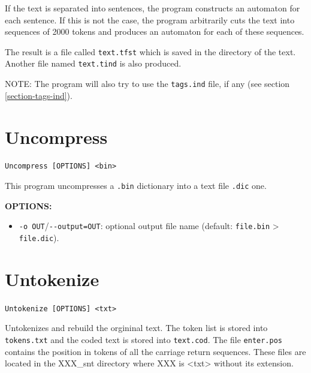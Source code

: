 \bigskip
\noindent If the text is separated into sentences, the program constructs an
automaton for each sentence. If this is not the case, the program arbitrarily
cuts the text into sequences of 2000 tokens and produces an automaton for
each of these sequences.

\bigskip
\noindent The result is a file called \verb+text.tfst+ which is saved in the directory of
the text. Another file named \verb+text.tind+ is also produced.

\bigskip
\noindent NOTE: The program will also try to use the \verb+tags.ind+ file, if
any (see section \ref{section-tags-ind}).







\section{Uncompress}
\label{section-Uncompress}
\verb+Uncompress [OPTIONS] <bin>+

\bigskip
\noindent This program uncompresses a \verb+.bin+ dictionary into a text file
\verb+.dic+ one.

\bigskip
\noindent \textbf{OPTIONS:}
\begin{itemize}
  \item \verb+-o OUT+/\verb+--output=OUT+: optional output file name (default:
  \verb+file.bin+ > \verb+file.dic+).
\end{itemize}








\section{Untokenize}
\label{section-Untokenize}
\verb+Untokenize [OPTIONS] <txt>+

\bigskip
\noindent Untokenizes and rebuild the orgininal text. The token list is stored into \verb+tokens.txt+ and
         the coded text is stored into \verb+text.cod+.
         The file \verb+enter.pos+ contains the position in tokens of all the carriage return sequences.
         These files are located in the XXX\_snt directory where XXX is <txt> without its extension.

